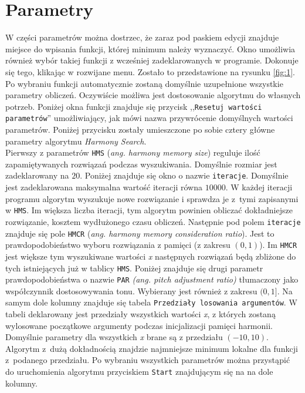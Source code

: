 \documentclass[10pt, a4paper]{article}
\begin{document}
\pagebreak

\section{Parametry}
\label{sec:parametry}
W części parametrów można dostrzec, że zaraz pod paskiem edycji znajduje miejsce do wpisania funkcji, której minimum należy wyznaczyć. Okno umożliwia również wybór takiej funkcji z wcześniej zadeklarowanych w programie. Dokonuje się tego, klikając w rozwijane menu. Zostało to przedstawione na rysunku \ref{fig:1}. Po wybraniu funkcji automatycznie zostaną domyślnie uzupełnione wszystkie parametry obliczeń. Oczywiście możliwa jest dostosowanie algorytmu do własnych potrzeb. Poniżej okna funkcji znajduje się przycisk ,,{\tt Resetuj wartości parametrów}'' umożliwiający, jak mówi nazwa przywrócenie domyślnych wartości parametrów. Poniżej przycisku zostały umieszczone po sobie cztery główne parametry algorytmu {\em Harmony Search}. \\

Pierwszy z parametrów {\tt HMS} ({\em ang. harmony memory size}) reguluje ilość zapamiętywanych rozwiązań podczas wyszukiwania. Domyślnie rozmiar jest zadeklarowany na $20$. Poniżej znajduje się okno o nazwie {\tt iteracje}. Domyślnie jest zadeklarowana maksymalna wartość iteracji równa $10000$. W każdej iteracji programu algorytm wyszukuje nowe rozwiązanie i sprawdza je z~tymi zapisanymi w {\tt HMS}. Im większa liczba iteracji, tym algorytm powinien obliczać dokładniejsze rozwiązanie, kosztem wydłużonego czasu obliczeń. Następnie pod polem {\tt iteracje} znajduje się pole {\tt HMCR} ({\em ang. harmony memory consideration ratio}). Jest to prawdopodobieństwo wyboru rozwiązania z pamięci (z zakresu $(0, 1)$). Im {\tt HMCR} jest większe tym wyszukiwane wartości {\em x} następnych rozwiązań będą zbliżone do tych istniejących już w tablicy {\tt HMS}. Poniżej znajduje się drugi parametr prawdopodobieństwa o nazwie {\tt PAR} {\em(ang. pitch adjustment ratio)} tłumaczony jako współczynnik dostosowywania tonu. Wybierany jest również z zakresu $(0, 1]$. Na samym dole kolumny znajduje się tabela {\tt Przedziały losowania argumentów}. W tabeli deklarowany jest przedziały wszystkich wartości {\em x}, z których zostaną wylosowane początkowe argumenty podczas inicjalizacji pamięci harmonii. Domyślnie parametry dla wszystkich {\em x} brane są z przedziału $(-10, 10)$. Algorytm z~dużą dokładnością znajdzie najmniejsze minimum lokalne dla funkcji z~podanego przedziału. Po wybraniu wszystkich parametrów można przystąpić do uruchomienia algorytmu przyciskiem {\tt Start} znajdującym się na na dole kolumny.
\end{document}
